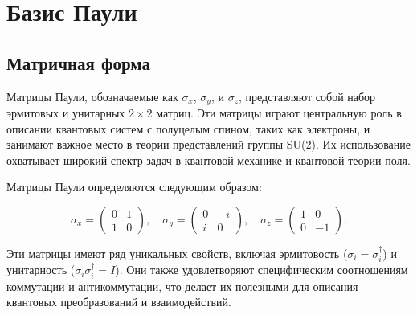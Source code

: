 \documentclass[a4paper]{report}
\begin{document}
\section{Базис Паули}

\subsection{Матричная форма}

Матрицы Паули, обозначаемые как $\sigma_x$, $\sigma_y$, и $\sigma_z$, представляют собой набор эрмитовых и унитарных $2 \times 2$ матриц. Эти матрицы играют центральную роль в описании квантовых систем с полуцелым спином, таких как электроны, и занимают важное место в теории представлений группы SU(2). Их использование охватывает широкий спектр задач в квантовой механике и квантовой теории поля.

Матрицы Паули определяются следующим образом:

$$
\sigma_x = \begin{pmatrix}
0 & 1 \\
1 & 0
\end{pmatrix}, \quad
\sigma_y = \begin{pmatrix}
0 & -i \\
i & 0
\end{pmatrix}, \quad
\sigma_z = \begin{pmatrix}
1 & 0 \\
0 & -1
\end{pmatrix}.
$$

Эти матрицы имеют ряд уникальных свойств, включая эрмитовость ($\sigma_i = \sigma_i^\dagger$) и унитарность ($\sigma_i \sigma_i^\dagger = I$). Они также удовлетворяют специфическим соотношениям коммутации и антикоммутации, что делает их полезными для описания квантовых преобразований и взаимодействий.
\end{document}
